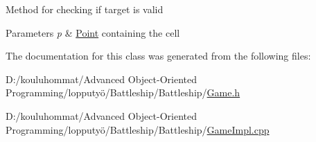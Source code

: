 Method for checking if target is valid 
\begin{DoxyParams}{Parameters}
{\em p} & \mbox{\hyperlink{class_point}{Point}} containing the cell \\
\hline
\end{DoxyParams}


The documentation for this class was generated from the following files\+:\begin{DoxyCompactItemize}
\item 
D\+:/kouluhommat/\+Advanced Object-\/\+Oriented Programming/lopputyö/\+Battleship/\+Battleship/\mbox{\hyperlink{_game_8h}{Game.\+h}}\item 
D\+:/kouluhommat/\+Advanced Object-\/\+Oriented Programming/lopputyö/\+Battleship/\+Battleship/\mbox{\hyperlink{_game_impl_8cpp}{Game\+Impl.\+cpp}}\end{DoxyCompactItemize}
